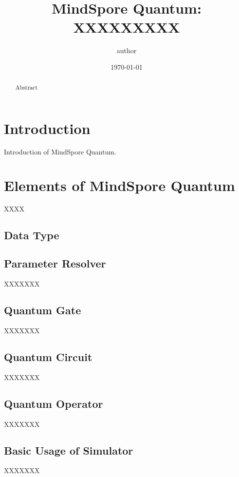 \documentclass[pra,twocolumn,superscriptaddress,floatfix,nofootinbib,amsmath,amssymb]{revtex4-1}
\begin{document}
\title{MindSpore Quantum: XXXXXXXXX
}



\author{author}


\date{\today}



\begin{abstract}
Abstract
\end{abstract}
\maketitle
\tableofcontents

\section{Introduction}
Introduction of MindSpore Quantum.

\section{Elements of MindSpore Quantum}
XXXX
\subsection{Data Type}


\subsection{Parameter Resolver}
XXXXXXX
\subsection{Quantum Gate}
XXXXXXX
\subsection{Quantum Circuit}
XXXXXXX
\subsection{Quantum Operator}
XXXXXXX
\subsection{Basic Usage of Simulator}
XXXXXXX
\end{document}
